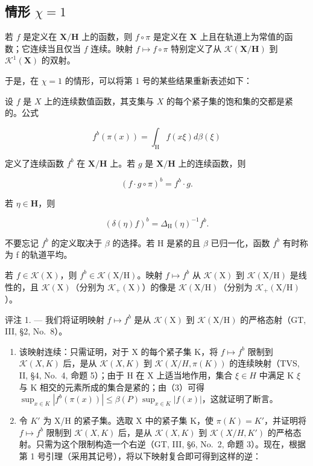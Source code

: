 \subsection{\texorpdfstring{情形 \(\chi = 1\)}{情形 \textbackslash chi = 1}}

若 \(f\) 是定义在 \(\mathbf{X} / \mathbf{H}\) 上的函数，则 \(f \circ \pi\) 是定义在 \(\mathbf{X}\) 上且在轨道上为常值的函数；它连续当且仅当 \(f\) 连续。映射 \(f \mapsto f \circ \pi\) 特别定义了从 \(\mathcal{K}(\mathbf{X} / \mathbf{H})\) 到 \(\mathcal{K}^1(\mathbf{X})\) 的双射。

于是，在 \(\chi = 1\) 的情形，可以将第 1 号的某些结果重新表述如下：

设 \(f\) 是 \(X\) 上的连续数值函数，其支集与 \(X\) 的每个紧子集的饱和集的交都是紧的。公式

\[
f ^ {b} (\pi (x)) = \int_ {\mathrm{H}} f (x \xi) d \beta (\xi)\tag{3}
\]

定义了连续函数 \(f^{b}\) 在 \(\mathbf{X} / \mathbf{H}\) 上。若 \(g\) 是 \(\mathbf{X} / \mathbf{H}\) 上的连续函数，则

\[
(f \cdot g \circ \pi) ^ {b} = f ^ {b} \cdot g.\tag{4}
\]

若 \(\eta \in \mathbf{H}\)，则

\[
\left(\delta (\eta) f\right) ^ {b} = \Delta_ {\mathrm{H}} (\eta) ^ {- 1} f ^ {b}.\tag{5}
\]

不要忘记 \(f^{b}\) 的定义取决于 \(\beta\) 的选择。若 H 是紧的且 \(\beta\) 已归一化，函数 \(f^{b}\) 有时称为 f 的轨道平均。

若 \(f \in \mathcal{K}(\mathrm{X})\)，则 \(f^{b} \in \mathcal{K}(\mathrm{X / H})\)。映射 \(f \mapsto f^{b}\) 从 \(\mathcal{K}(\mathrm{X})\) 到 \(\mathcal{K}(\mathrm{X / H})\) 是线性的，且 \(\mathcal{K}(\mathrm{X})\)（分别为 \(\mathcal{K}_{+}(\mathrm{X})\)）的像是 \(\mathcal{K}(\mathrm{X / H})\)（分别为 \(\mathcal{K}_{+}(\mathrm{X / H})\)）。

评注 1. --- 我们将证明映射 \(f \mapsto f^{b}\) 是从 \(\mathcal{K}(\mathrm{X})\) 到 \(\mathcal{K}(\mathrm{X}/\mathrm{H})\) 的严格态射（GT, III, §2, No.~8）。

\begin{enumerate}
\def\labelenumi{\alph{enumi})}
\item
  该映射连续：只需证明，对于 X 的每个紧子集 K，将 \(f \mapsto f^{b}\) 限制到 \(\mathcal{K}(X, K)\) 后，是从 \(\mathcal{K}(X, K)\) 到 \(\mathcal{K}(X / H, \pi(K))\) 的连续映射（TVS, II, §4, No.~4, 命题 5）；由于 H 在 X 上适当地作用，集合 \(\xi \in H\) 中满足 K \(\xi\) 与 K 相交的元素所成的集合是紧的；由（3）可得 \(\sup_{x \in K} |f^{b}(\pi(x))| \leqslant \beta(P) \sup_{x \in K} |f(x)|\)，这就证明了断言。
\item
  令 \(K'\) 为 X/H 的紧子集。选取 X 中的紧子集 K，使 \(\pi(K) = K'\)，并证明将 \(f \mapsto f^{b}\) 限制到 \(\mathcal{K}(X, K)\) 后，是从 \(\mathcal{K}(X, K)\) 到 \(\mathcal{K}(X/H, K')\) 的严格态射。只需为这个限制构造一个右逆（GT, III, §6, No.~2, 命题 3）。现在，根据第 1 号引理（采用其记号），将以下映射复合即可得到这样的逆：
\end{enumerate}

